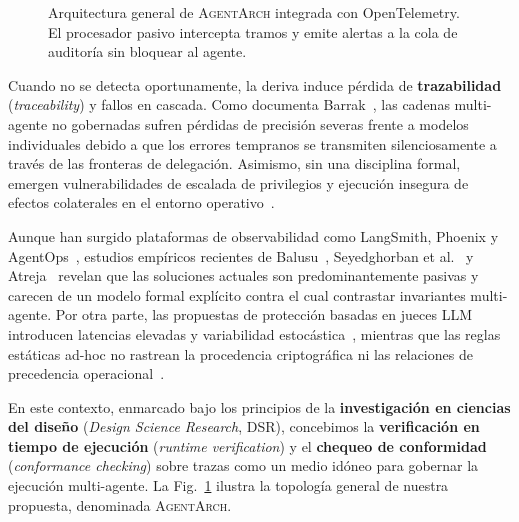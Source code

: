 \documentclass[conference]{IEEEtran}
\begin{document}
\begin{figure}[t]
\caption{Arquitectura general de \textsc{AgentArch} integrada con OpenTelemetry. El procesador pasivo intercepta tramos y emite alertas a la cola de auditor\'ia sin bloquear al agente.}
\label{fig:architecture}
\end{figure}

Cuando no se detecta oportunamente, la deriva induce p\'erdida de \textbf{trazabilidad} (\emph{traceability}) y fallos en cascada. Como documenta Barrak~\cite{barrak2025}, las cadenas multi-agente no gobernadas sufren p\'erdidas de precisi\'on severas frente a modelos individuales debido a que los errores tempranos se transmiten silenciosamente a trav\'es de las fronteras de delegaci\'on. Asimismo, sin una disciplina formal, emergen vulnerabilidades de escalada de privilegios y ejecuci\'on insegura de efectos colaterales en el entorno operativo~\cite{wangh2026, wangs2026}.

Aunque han surgido plataformas de observabilidad como LangSmith, Phoenix y AgentOps~\cite{dong2024}, estudios emp\'iricos recientes de Balusu~\cite{balusu2026}, Seyedghorban et al.~\cite{seyedghorban2026} y Atreja~\cite{atreja2026} revelan que las soluciones actuales son predominantemente pasivas y carecen de un modelo formal expl\'icito contra el cual contrastar invariantes multi-agente. Por otra parte, las propuestas de protecci\'on basadas en jueces LLM introducen latencias elevadas y variabilidad estoc\'astica~\cite{anand2026}, mientras que las reglas est\'aticas ad-hoc no rastrean la procedencia criptogr\'afica ni las relaciones de precedencia operacional~\cite{wangh2026}.

En este contexto, enmarcado bajo los principios de la \textbf{investigaci\'on en ciencias del dise\~no} (\emph{Design Science Research}, DSR), concebimos la \textbf{verificaci\'on en tiempo de ejecuci\'on} (\emph{runtime verification}) y el \textbf{chequeo de conformidad} (\emph{conformance checking}) sobre trazas como un medio id\'oneo para gobernar la ejecuci\'on multi-agente. La Fig.~\ref{fig:architecture} ilustra la topolog\'ia general de nuestra propuesta, denominada \textsc{AgentArch}.
\end{document}
